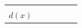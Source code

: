 {{\begin{center}
\begin{tabular}[t]{|l|l|l|l|l|l|}
         &
         &
         &
         &
     \tabularnewline\cline{1-1}\cline{2-2}\cline{3-3}\cline{4-4}\cline{5-5}\cline{6-6}
                  $d\left(x\right)$
                 &
         &
         &
         &
         &
     \tabularnewline\cline{1-1}\cline{2-2}\cline{3-3}\cline{4-4}\cline{5-5}\cline{6-6}

\end{tabular}
\end{center}}}

